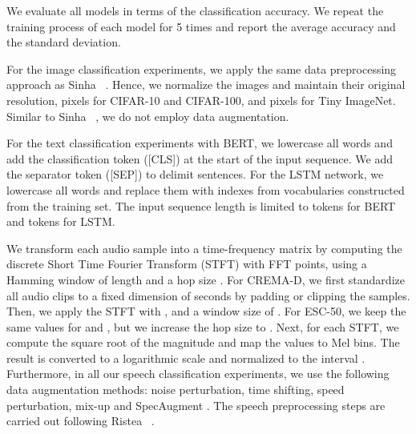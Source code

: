 \documentclass[10pt,twocolumn,letterpaper]{article}
\begin{document}
 We evaluate all models in terms of the classification accuracy. We repeat the training process of each model for 5 times and report the average accuracy and the standard deviation.

For the image classification experiments, we apply the same data preprocessing approach as Sinha \etal~\cite{Sinha-NIPS-2020}. Hence, we normalize the images and maintain their original resolution,  pixels for CIFAR-10 and CIFAR-100, and  pixels for Tiny ImageNet. Similar to Sinha \etal~\cite{Sinha-NIPS-2020}, we do not employ data augmentation.

For the text classification experiments with BERT, we lowercase all words and add the classification token ([CLS]) at the start of the input sequence. We add the separator token ([SEP]) to delimit sentences. For the LSTM network, we lowercase all words and replace them with indexes from vocabularies constructed from the training set. The input sequence length is limited to  tokens for BERT and  tokens for LSTM.

We transform each audio sample into a time-frequency matrix by computing the discrete Short Time Fourier Transform (STFT) with  FFT points, using a Hamming window of length  and a hop size .
For CREMA-D, we first standardize all audio clips to a fixed dimension of  seconds by padding or clipping the samples. Then, we apply the STFT with ,  and a window size of . For ESC-50, we keep the same values for  and ,
but we increase the hop size to . Next, for each STFT, we compute the square root of the magnitude and map the values to  Mel bins. The result is converted to a logarithmic scale and normalized to the interval . Furthermore, in all our speech classification experiments, we use the following data augmentation methods: noise perturbation, time shifting, speed perturbation, mix-up and SpecAugment \cite{Park-INTERSPEECH-2019}. The speech preprocessing steps are carried out following Ristea \etal~\cite{Ristea-ARXIV-2022}.
\end{document}
